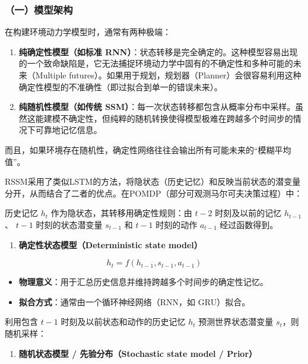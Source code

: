 \hypertarget{ux4e00ux6a21ux578bux67b6ux6784}{%
\subsubsection{（一）模型架构}\label{ux4e00ux6a21ux578bux67b6ux6784}}

在构建环境动力学模型时，通常有两种极端：

\begin{enumerate}
\def\labelenumi{\arabic{enumi}.}
\item
  \textbf{纯确定性模型（如标准 RNN）}：状态转移是完全确定的。这种模型容易出现的一个致命缺陷是，它无法捕捉环境动力学中固有的不确定性和多种可能的未来（Multiple futures）。如果用于规划，规划器（Planner）会很容易利用这种确定性模型的不准确性（即过拟合到单一的错误未来）。
\item
  \textbf{纯随机性模型（如传统 SSM）}：每一次状态转移都包含从概率分布中采样。虽然这能建模不确定性，但纯粹的随机转换使得模型极难在跨越多个时间步的情况下可靠地记忆信息。
\end{enumerate}

而且，如果环境存在随机性，确定性网络往往会输出所有可能未来的``模糊平均值''。

RSSM采用了类似LSTM的方法，将隐状态（历史记忆）和反映当前状态的潜变量分开，从而结合了二者的优点。在POMDP（部分可观测马尔可夫决策过程）中：

历史记忆 \(h_t\) 作为隐状态，其转移用确定性规则：由 \(t-2\) 时刻及以前的记忆 \(h_{t-1}\)、 \(t-1\) 时刻的状态潜变量 \(s_{t-1}\) 和 \(t-1\) 时刻的动作 \(a_{t-1}\) 经过函数得到。

\begin{enumerate}
\def\labelenumi{\arabic{enumi}.}
\tightlist
\item
  \textbf{确定性状态模型（Deterministic state model）}
\end{enumerate}

\[
h_t = f(h_{t-1}, s_{t-1}, a_{t-1})
\]

\begin{itemize}
\tightlist
\item
  \textbf{物理意义}：用于汇总历史信息并维持跨越多个时间步的确定性记忆。
\item
  \textbf{拟合方式}：通常由一个循环神经网络（RNN，如 GRU）拟合。
\end{itemize}

利用包含 \(t-1\) 时刻及以前状态和动作的历史记忆 \(h_t\) 预测世界状态潜变量 \(s_t\)，则随机采样：

\begin{enumerate}
\def\labelenumi{\arabic{enumi}.}
\setcounter{enumi}{1}
\tightlist
\item
  \textbf{随机状态模型 / 先验分布（Stochastic state model / Prior）}
\end{enumerate}

